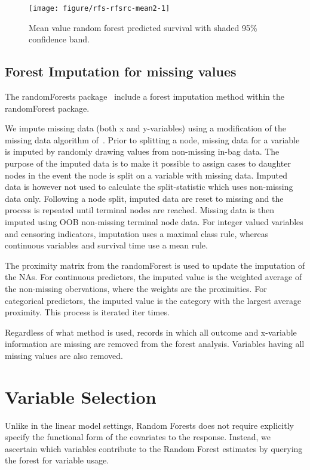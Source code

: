 \documentclass[nojss]{jss}
\begin{document}
\begin{Schunk}
\begin{figure}[!htpb]

{\centering \texttt{[image: figure/rfs-rfsrc-mean2-1]} 

}

\caption[Mean value random forest predicted survival with shaded 95\% confidence band]{Mean value random forest predicted survival with shaded 95\% confidence band.\label{fig:rfsrc-mean2}}
\end{figure}
\end{Schunk}
\subsection{Forest Imputation for missing values}\label{S:imputation}

The randomForests package~\citep{liaw:2002} include a forest imputation method within the randomForest package. 

We impute missing data (both x and y-variables) using a modification of the missing data algorithm of~\cite{Ishwaran:2008}. Prior to splitting a node, missing data for a variable is imputed by randomly drawing values from non-missing in-bag data. The purpose of the imputed data is to make it possible to assign cases to daughter nodes in the event the node is split on a variable with missing data. Imputed data is however not used to calculate the split-statistic which uses non-missing data only. Following a node split, imputed data are reset to missing and the process is repeated until terminal nodes are reached. Missing data is then imputed using OOB non-missing terminal node data. For integer valued variables and censoring indicators, imputation uses a maximal class rule, whereas continuous variables and survival time use a mean rule.

The proximity matrix from the randomForest is used to update the imputation of the NAs. For continuous predictors, the imputed value is the weighted average of the non-missing obervations, where the weights are the proximities. For categorical predictors, the imputed value is the category with the largest average proximity. This process is iterated iter times.

Regardless of what method is used, records in which all outcome and x-variable information are missing are removed from the forest analysis. Variables having all missing values are also removed.


\section{Variable Selection}
Unlike in the linear model settings, Random Forests does not require explicitly specify the functional form of the covariates to the response. Instead, we ascertain which variables contribute to the Random Forest estimates by querying the forest for variable usage. 
\end{document}
